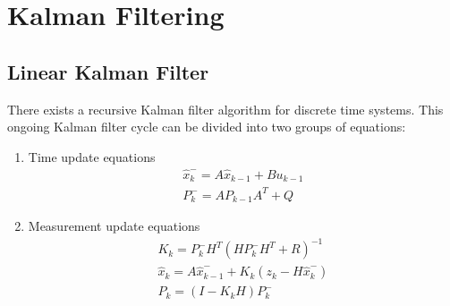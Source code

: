
\chapter{Kalman Filtering}

\section{Linear Kalman Filter}
There exists a recursive Kalman filter algorithm for discrete time systems.\cite{IntroKF} This ongoing Kalman filter cycle can be divided into two groups of equations: \newline
\begin{enumerate}
	\item Time update equations
	\begin{equation}\label{TupEq}
		\begin{aligned}
    			\hat{x}_{k}^{-}=A\hat{x}_{k-1}+Bu_{k-1} \\
    			P_{k}^{-}=AP_{k-1}A^{T}+Q
  		\end{aligned}
	\end{equation}
	\item Measurement update equations
	\begin{equation}\label{MupEq}
		\begin{aligned}
    			K_{k}=P_{k}^{-}H^{T}(HP_{k}^{-}H^{T}+R)^{-1} \\
    			\hat{x}_{k}=A\hat{x}_{k-1}^{-}+K_{k}(z_{k}-H\hat{x}_{k}^{-}) \\
			P_{k}=(I-K_{k}H)P_{k}^{-}
  		\end{aligned}
	\end{equation}
\end{enumerate}

